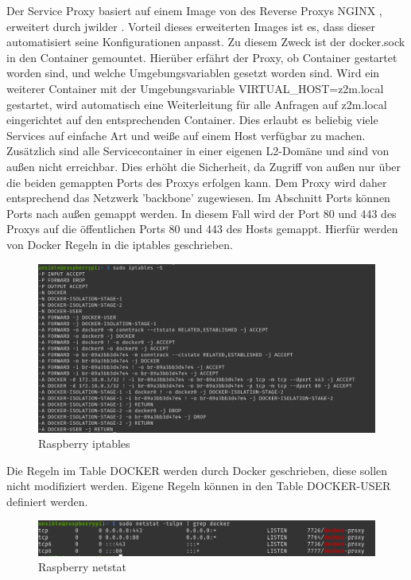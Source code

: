Der Service Proxy basiert auf einem Image von des Reverse Proxys NGINX \cite{nginxpm}, erweitert durch \grqq jwilder \grqq{}. Vorteil dieses erweiterten Images ist es,
dass dieser automatisiert seine Konfigurationen anpasst. Zu diesem Zweck ist der \grqq docker.sock \grqq{} in den Container gemountet. Hierüber erfährt
der Proxy, ob Container gestartet worden sind, und welche Umgebungsvariablen gesetzt worden sind. Wird ein weiterer Container mit der Umgebungsvariable 
\grqq VIRTUAL\_HOST=z2m.local \grqq{} gestartet, wird automatisch eine Weiterleitung für alle Anfragen auf \grqq z2m.local\grqq{} eingerichtet auf den entsprechenden Container.
Dies erlaubt es beliebig viele Services auf einfache Art und weiße auf einem Host verfügbar zu machen. Zusätzlich sind alle Servicecontainer in einer 
eigenen L2-Domäne und sind von außen nicht erreichbar. Dies erhöht die Sicherheit, da Zugriff von außen nur über die beiden gemappten Ports des Proxys 
erfolgen kann. Dem Proxy wird daher entsprechend das Netzwerk 'backbone' zugewiesen. Im Abschnitt \grqq Ports \grqq{} können Ports nach außen gemappt werden.
In diesem Fall wird der Port 80 und 443 des Proxys auf die öffentlichen Ports 80 und 443 des Hosts gemappt. Hierfür werden von Docker Regeln in die 
\grqq iptables \grqq{} geschrieben. 

\begin{figure}[H]
  \centering
  \includegraphics[width=1\textwidth]{media/rasp-iptables.png}
  \caption{Raspberry iptables}
\end{figure}

Die Regeln im Table \grqq DOCKER \grqq{} werden durch Docker geschrieben, diese sollen nicht modifiziert werden. Eigene Regeln können in den Table 
\grqq DOCKER-USER \grqq{} definiert werden.

\begin{figure}[H]
  \centering
  \includegraphics[width=1\textwidth]{media/rasp-netstat.png}
  \caption{Raspberry netstat}
\end{figure}

